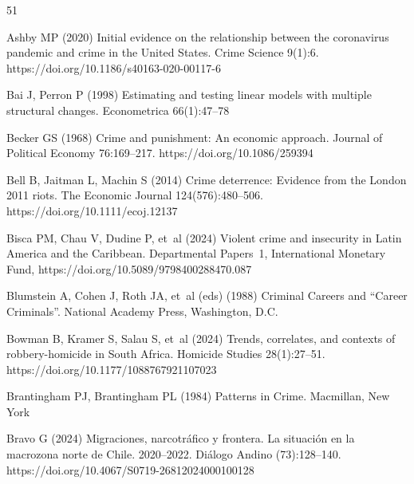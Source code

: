 \documentclass[pdflatex,sn-basic]{sn-jnl}
\begin{document}
\renewcommand{\refname}{References}
\begin{thebibliography}{51}
\providecommand{\natexlab}[1]{#1}
\providecommand{\url}[1]{{#1}}
\providecommand{\urlprefix}{URL }
\providecommand{\doi}[1]{\url{https://doi.org/#1}}
\providecommand{\eprint}[2][]{\url{#2}}
 \bibcommenthead

Ashby MP (2020) Initial evidence on the relationship between the coronavirus
  pandemic and crime in the {United States}. Crime Science 9(1):6.
  \doi{10.1186/s40163-020-00117-6}

Bai J, Perron P (1998) Estimating and testing linear models with multiple
  structural changes. Econometrica 66(1):47--78

Becker GS (1968) Crime and punishment: {A}n economic approach. Journal of
  Political Economy 76:169--217. \doi{10.1086/259394}

Bell B, Jaitman L, Machin S (2014) Crime deterrence: {E}vidence from the
  {London} 2011 riots. The Economic Journal 124(576):480--506.
  \doi{10.1111/ecoj.12137}

Bisca PM, Chau V, Dudine P, et~al (2024) Violent crime and insecurity in {Latin
  America} and the {Caribbean}. Departmental Papers~1, International Monetary
  Fund, \doi{10.5089/9798400288470.087}

Blumstein A, Cohen J, Roth JA, et~al (eds)  (1988) Criminal Careers and
  ``{Career Criminals}''. National Academy Press, Washington, D.C.

Bowman B, Kramer S, Salau S, et~al (2024) Trends, correlates, and contexts of
  robbery-homicide in {South Africa}. Homicide Studies 28(1):27--51.
  \doi{10.1177/1088767921107023}

Brantingham PJ, Brantingham PL (1984) Patterns in Crime. Macmillan, New York

Bravo G (2024) Migraciones, narcotr\'afico y frontera. {L}a situaci\'on en la
  macrozona norte de {Chile}. 2020--2022. Di\'alogo Andino (73):128--140.
  \doi{10.4067/S0719-26812024000100128}


\end{thebibliography}
\end{document}
